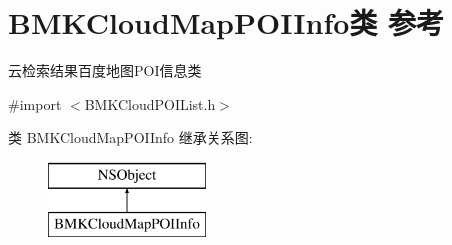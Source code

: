\hypertarget{interface_b_m_k_cloud_map_p_o_i_info}{}\section{B\+M\+K\+Cloud\+Map\+P\+O\+I\+Info类 参考}
\label{interface_b_m_k_cloud_map_p_o_i_info}


云检索结果百度地图\+P\+O\+I信息类  




{\ttfamily \#import $<$B\+M\+K\+Cloud\+P\+O\+I\+List.\+h$>$}

类 B\+M\+K\+Cloud\+Map\+P\+O\+I\+Info 继承关系图\+:\begin{figure}[H]
\begin{center}
\leavevmode
\includegraphics[height=2.000000cm]{interface_b_m_k_cloud_map_p_o_i_info}
\end{center}
\end{figure}
